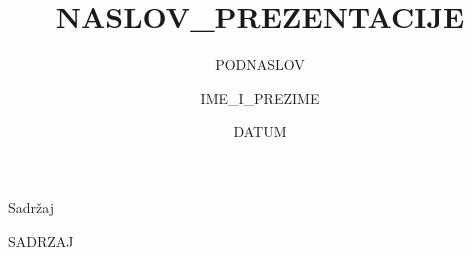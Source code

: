 \documentclass{beamer}
\title{{{NASLOV_PREZENTACIJE}}}
\subtitle{{{PODNASLOV}}}
\author{{{IME_I_PREZIME}}}
\institute{{{INSTITUCIJA}}}
\date{{{DATUM}}}
\begin{document}
\begin{frame}
  \titlepage
\end{frame}

\begin{frame}{Sadržaj}
  \tableofcontents
\end{frame}

{{SADRZAJ}}
\end{document}
